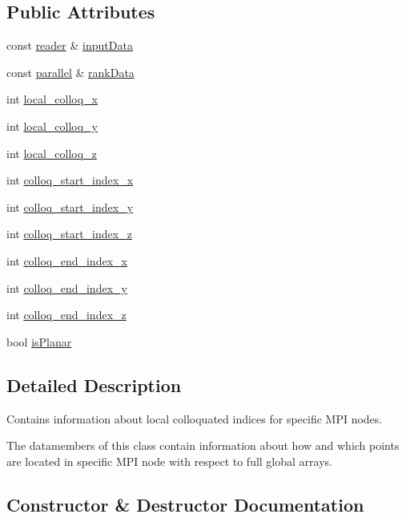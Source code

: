 \subsection*{Public Attributes}
\begin{DoxyCompactItemize}
\item 
const \hyperlink{classreader}{reader} \& \hyperlink{classgrid_a0c044c1334ceb75cd73cfe1a1b5d471e}{input\+Data}
\item 
const \hyperlink{classparallel}{parallel} \& \hyperlink{classgrid_a601c3c843a2152673af275a88a140c5f}{rank\+Data}
\item 
int \hyperlink{classgrid_a3f952029096b1590f4c1513405304153}{local\+\_\+colloq\+\_\+x}
\item 
int \hyperlink{classgrid_ab6ebb66bae61b6993443e5d0a3dd1f66}{local\+\_\+colloq\+\_\+y}
\item 
int \hyperlink{classgrid_af91a948b95d0a97f7a75551f9500c38e}{local\+\_\+colloq\+\_\+z}
\item 
int \hyperlink{classgrid_a099a1e0ad70bd32866294969e886e9d0}{colloq\+\_\+start\+\_\+index\+\_\+x}
\item 
int \hyperlink{classgrid_a562323a98093d6eaf640785d79334208}{colloq\+\_\+start\+\_\+index\+\_\+y}
\item 
int \hyperlink{classgrid_ab729ac896753c9ed4a750ec9af6ccfd3}{colloq\+\_\+start\+\_\+index\+\_\+z}
\item 
int \hyperlink{classgrid_aad48d3e38805c0c7dfa070c3fcfe3ffd}{colloq\+\_\+end\+\_\+index\+\_\+x}
\item 
int \hyperlink{classgrid_abb0480cb2d7fbb17a95502925d706731}{colloq\+\_\+end\+\_\+index\+\_\+y}
\item 
int \hyperlink{classgrid_ad56fd8b3690637ece99545c81e3f6942}{colloq\+\_\+end\+\_\+index\+\_\+z}
\item 
bool \hyperlink{classgrid_ad0060eb1dc9b2fef5e4642b5b0ef6d5e}{is\+Planar}
\end{DoxyCompactItemize}


\subsection{Detailed Description}
Contains information about local colloquated indices for specific M\+PI nodes. 

The datamembers of this class contain information about how and which points are located in specific M\+PI node with respect to full global arrays. 

\subsection{Constructor \& Destructor Documentation}
